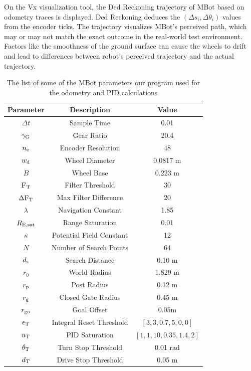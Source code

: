 \documentclass[conference]{IEEEtran}
\begin{document}
On the Vx visualization tool, the Ded Reckoning trajectory of MBot based on odometry traces is displayed. Ded Reckoning deduces the $(\Delta s_i, \Delta\theta_i)$ values from the encoder ticks. The trajectory visualizes MBot's perceived path, which may or may not match the exact outcome in the real-world test environment. Factors like the smoothness of the ground surface can cause the wheels to drift and lead to differences between robot's perceived trajectory and the actual trajectory.

\begin{table}[h]
\caption{The list of some of the MBot parameters our program used for the odometry and PID calculations}
\label{tab:params}
\begin{center}
\begin{tabular}{|c| c| c|}
\hline
Parameter &Description    	 &Value \\
\hline
    $\Delta t$ &Sample Time &0.01\\
    $\gamma_{\rm G}$ &Gear Ratio &20.4 \\
    $n_{\rm e}$    &Encoder Resolution &48 \\
    $w_{\rm d}$ &Wheel Diameter &0.0817 m\\
    $B$ &Wheel Base &0.223 m\\
    ${\rm F}_{\rm T}$ &Filter Threshold &30\\
    $\Delta {\rm F}_{\rm T}$ &Max Filter Difference &20\\
    $\lambda$    &Navigation Constant   &1.85    \\
    $R_{{\rm E}, \rm{sat}}$ &Range Saturation &0.01 \\
    $\kappa$    &Potential Field Constant   &12 \\
    $N$ &Number of Search Points &64\\
    $d_{\rm s}$ &Search Distance &0.10 m\\
    $r_0$ &World Radius &1.829 m\\
    $r_{\rm p}$ &Post Radius &0.12 m\\
    $r_{\rm g}$ &Closed Gate Radius &0.45 m\\
    $r_{{\rm g} {\rm o}}$ &Goal Offset &0.05m \\
    $e_{\rm T}$ &Integral Reset Threshold & $[3,3,0.7,5,0,0]$ \\
    $u_{\rm T}$ &PID Saturation & $[1,1,10,0.35,1.4,2]$ \\
    $\theta_{\rm T}$ &Turn Stop Threshold &0.01 rad\\
    $d_{\rm T}$ &Drive Stop Threshold &0.05 m\\

\end{tabular}
\end{center}
\end{table}
\end{document}
